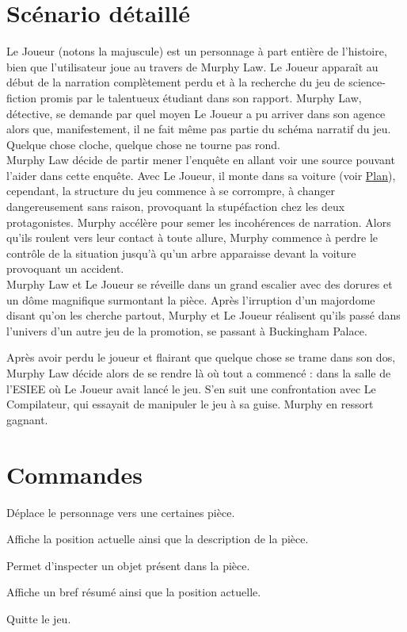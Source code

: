 \documentclass[a4paper,12pt]{report}
\begin{document}
\section{Scénario détaillé}

Le Joueur (notons la majuscule) est un personnage à part entière de l'histoire, bien que l'utilisateur joue au travers de Murphy Law. Le Joueur apparaît au début de la narration complètement perdu et à la recherche du jeu de science-fiction promis par le talentueux étudiant dans son rapport. Murphy Law, détective, se demande par quel moyen Le Joueur a pu arriver dans son agence alors que, manifestement, il ne fait même pas partie du schéma narratif du jeu. Quelque chose cloche, quelque chose ne tourne pas rond.\\

Murphy Law décide de partir mener l'enquête en allant voir une source pouvant l'aider dans cette enquête. Avec Le Joueur, il monte dans sa voiture (voir \hyperlink{section.1.6}{Plan}), cependant, la structure du jeu commence à se corrompre, à changer dangereusement sans raison, provoquant la stupéfaction chez les deux protagonistes. Murphy accélère pour semer les incohérences de narration. Alors qu'ils roulent vers leur contact à toute allure, Murphy commence à perdre le contrôle de la situation jusqu'à qu'un arbre apparaisse devant la voiture provoquant un accident.\\

Murphy Law et Le Joueur se réveille dans un grand escalier avec des dorures et un dôme magnifique surmontant la pièce. Après l'irruption d'un majordome disant qu'on les cherche partout, Murphy et Le Joueur réalisent qu'ils passé dans l'univers d'un autre jeu de la promotion, se passant à Buckingham Palace. 

Après avoir perdu le joueur et flairant que quelque chose se trame dans son dos, Murphy Law décide alors de se rendre là où tout a commencé : dans la salle de l'ESIEE où Le Joueur avait lancé le jeu. S'en suit une confrontation avec Le Compilateur, qui essayait de manipuler le jeu à sa guise. Murphy en ressort gagnant.\\

\section{Commandes}

\begin{description}[leftmargin=!,labelwidth=\widthof{\bfseries inspect \textit{objet}}]
  \item [go \textit{direction}] Déplace le personnage vers une certaines pièce.
  \item [look] Affiche la position actuelle ainsi que la description de la pièce.
  \item [inspect \textit{objet}] Permet d'inspecter un objet présent dans la pièce.
  \item [help] Affiche un bref résumé ainsi que la position actuelle.
  \item [quit] Quitte le jeu.
\end{description}
\end{document}
